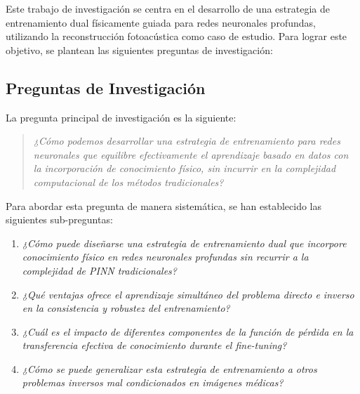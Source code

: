 \label{sec:intro_questions}
Este trabajo de investigación se centra en el desarrollo de una estrategia de entrenamiento dual físicamente guiada para redes neuronales profundas, utilizando la reconstrucción fotoacústica como caso de estudio. Para lograr este objetivo, se plantean las siguientes preguntas de investigación:

\subsection{Preguntas de Investigación}
\label{sec:intro_questions2}
La pregunta principal de investigación es la siguiente:

\begin{quote}
\textit{¿Cómo podemos desarrollar una estrategia de entrenamiento para redes neuronales que equilibre efectivamente el aprendizaje basado en datos con la incorporación de conocimiento físico, sin incurrir en la complejidad computacional de los métodos tradicionales?}
\end{quote}
Para abordar esta pregunta de manera sistemática, se han establecido las siguientes sub-preguntas:
\begin{enumerate}[start=1,label={PI\arabic*:},wide = 0pt, leftmargin = 3em]
\item \textit{¿Cómo puede diseñarse una estrategia de entrenamiento dual que incorpore conocimiento físico en redes neuronales profundas sin recurrir a la complejidad de PINN tradicionales?}
\item \textit{¿Qué ventajas ofrece el aprendizaje simultáneo del problema directo e inverso en la consistencia y robustez del entrenamiento?}
\item \textit{¿Cuál es el impacto de diferentes componentes de la función de pérdida en la transferencia efectiva de conocimiento durante el fine-tuning?}
\item \textit{¿Cómo se puede generalizar esta estrategia de entrenamiento a otros problemas inversos mal condicionados en imágenes médicas?}
\end{enumerate}
